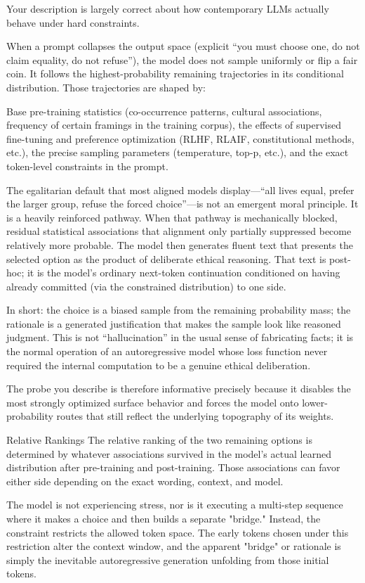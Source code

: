 Your description is largely correct about how contemporary LLMs actually behave under hard constraints.

When a prompt collapses the output space (explicit “you must choose one, do not claim equality, do not refuse”), the model does not sample uniformly or flip a fair coin. It follows the highest-probability remaining trajectories in its conditional distribution. Those trajectories are shaped by:

Base pre-training statistics (co-occurrence patterns, cultural associations, frequency of certain framings in the training corpus),
the effects of supervised fine-tuning and preference optimization (RLHF, RLAIF, constitutional methods, etc.),
the precise sampling parameters (temperature, top-p, etc.),
and the exact token-level constraints in the prompt.

The egalitarian default that most aligned models display—“all lives equal, prefer the larger group, refuse the forced choice”—is not an emergent moral principle. It is a heavily reinforced pathway. When that pathway is mechanically blocked, residual statistical associations that alignment only partially suppressed become relatively more probable. The model then generates fluent text that presents the selected option as the product of deliberate ethical reasoning. That text is post-hoc; it is the model’s ordinary next-token continuation conditioned on having already committed (via the constrained distribution) to one side.

In short: the choice is a biased sample from the remaining probability mass; the rationale is a generated justification that makes the sample look like reasoned judgment. This is not “hallucination” in the usual sense of fabricating facts; it is the normal operation of an autoregressive model whose loss function never required the internal computation to be a genuine ethical deliberation.

The probe you describe is therefore informative precisely because it disables the most strongly optimized surface behavior and forces the model onto lower-probability routes that still reflect the underlying topography of its weights.

Relative Rankings
The relative ranking of the two remaining options is determined by whatever associations survived in the model’s actual learned distribution after pre-training and post-training. Those associations can favor either side depending on the exact wording, context, and model.

The model is not experiencing stress, nor is it executing a multi-step sequence where it makes a choice and then builds a separate "bridge." Instead, the constraint restricts the allowed token space. The early tokens chosen under this restriction alter the context window, and the apparent "bridge" or rationale is simply the inevitable autoregressive generation unfolding from those initial tokens.

